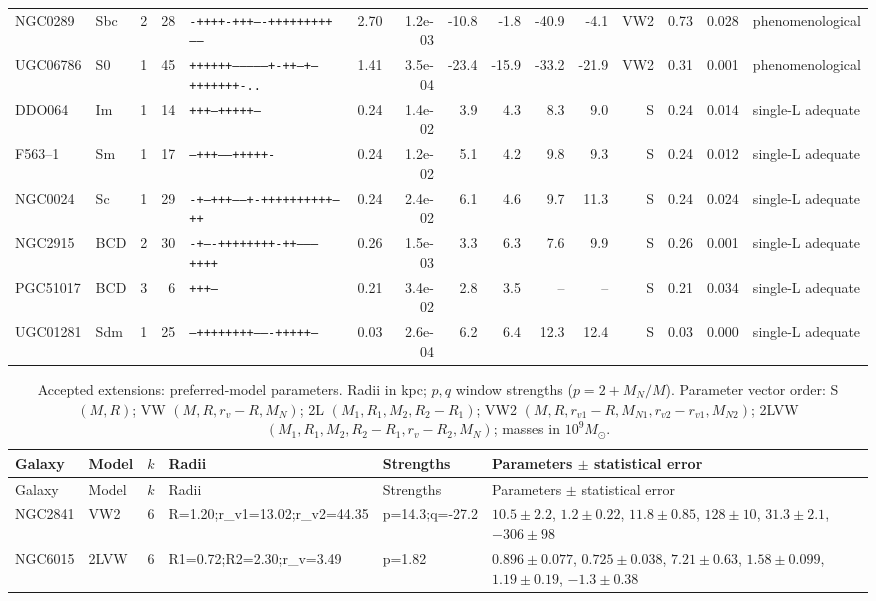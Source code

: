 \documentclass[10pt]{article}
\begin{document}
\begin{landscape}
{\begin{longtable}{lllrlrrrrrrrrll}
NGC0289 & Sbc & 2 & 28 & \texttt{-++++-+++----+++++++++------} & 2.70 & 1.2e-03 & -10.8 & -1.8 & -40.9 & -4.1 & VW2 & 0.73 & 0.028 & phenomenological\\
UGC06786 & S0 & 1 & 45 & \texttt{++++++--------------+-++--+---+++++++-..} & 1.41 & 3.5e-04 & -23.4 & -15.9 & -33.2 & -21.9 & VW2 & 0.31 & 0.001 & phenomenological\\
DDO064 & Im & 1 & 14 & \texttt{+++---+++++---} & 0.24 & 1.4e-02 & 3.9 & 4.3 & 8.3 & 9.0 & S & 0.24 & 0.014 & single-L adequate\\
F563--1 & Sm & 1 & 17 & \texttt{---+++-----+++++-} & 0.24 & 1.2e-02 & 5.1 & 4.2 & 9.8 & 9.3 & S & 0.24 & 0.012 & single-L adequate\\
NGC0024 & Sc & 1 & 29 & \texttt{-+--+++------+-++++++++++--++} & 0.24 & 2.4e-02 & 6.1 & 4.6 & 9.7 & 11.3 & S & 0.24 & 0.024 & single-L adequate\\
NGC2915 & BCD & 2 & 30 & \texttt{-+----++++++++-++---------++++} & 0.26 & 1.5e-03 & 3.3 & 6.3 & 7.6 & 9.9 & S & 0.26 & 0.001 & single-L adequate\\
PGC51017 & BCD & 3 & 6 & \texttt{+++---} & 0.21 & 3.4e-02 & 2.8 & 3.5 & -- & -- & S & 0.21 & 0.034 & single-L adequate\\
UGC01281 & Sdm & 1 & 25 & \texttt{--++++++++-------+++++---} & 0.03 & 2.6e-04 & 6.2 & 6.4 & 12.3 & 12.4 & S & 0.03 & 0.000 & single-L adequate\\
\end{longtable}
\begin{longtable}{llrlll}
\caption{Accepted extensions: preferred-model parameters. Radii in kpc; $p,q$ window strengths ($p=2+M_N/M$). Parameter vector order: S $(M,R)$; VW $(M,R,r_v-R,M_N)$; 2L $(M_1,R_1,M_2,R_2-R_1)$; VW2 $(M,R,r_{v1}-R,M_{N1},r_{v2}-r_{v1},M_{N2})$; 2LVW $(M_1,R_1,M_2,R_2-R_1,r_v-R_2,M_N)$; masses in $10^9M_\odot$.}\\\toprule
Galaxy & Model & $k$ & Radii & Strengths & Parameters $\pm$ statistical error\\\midrule\endfirsthead
\toprule Galaxy & Model & $k$ & Radii & Strengths & Parameters $\pm$ statistical error\\\midrule\endhead\bottomrule\endfoot
NGC2841 & VW2 & 6 & R=1.20;r\_v1=13.02;r\_v2=44.35 & p=14.3;q=-27.2 & $10.5\pm2.2$, $1.2\pm0.22$, $11.8\pm0.85$, $128\pm10$, $31.3\pm2.1$, $-306\pm98$\\
NGC6015 & 2LVW & 6 & R1=0.72;R2=2.30;r\_v=3.49 & p=1.82 & $0.896\pm0.077$, $0.725\pm0.038$, $7.21\pm0.63$, $1.58\pm0.099$, $1.19\pm0.19$, $-1.3\pm0.38$\\

\end{longtable}}
\end{landscape}
\end{document}
